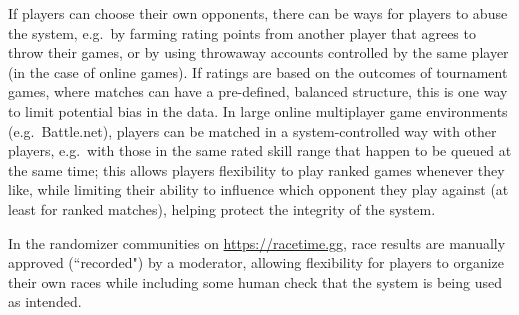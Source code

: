 \documentclass{article}
\begin{document}
	If players can choose their own opponents, there can be ways for players to abuse the system, e.g.\ by farming rating points from another player that agrees to throw their games, or by using throwaway accounts controlled by the same player (in the case of online games). If ratings are based on the outcomes of tournament games, where matches can have a pre-defined, balanced structure, this is one way to limit potential bias in the data. In large online multiplayer game environments (e.g.\ Battle.net), players can be matched in a system-controlled way with other players, e.g.\ with those in the same rated skill range that happen to be queued at the same time; this allows players flexibility to play ranked games whenever they like, while limiting their ability to influence which opponent they play against (at least for ranked matches), helping protect the integrity of the system.
	
	In the randomizer communities on \url{https://racetime.gg}, race results are manually approved (``recorded") by a moderator, allowing flexibility for players to organize their own races while including some human check that the system is being used as intended.
	
	
\end{document}
